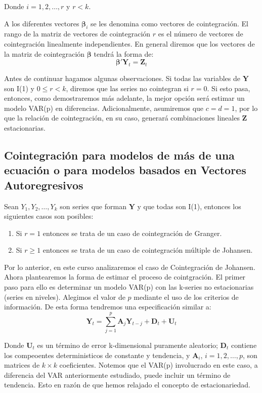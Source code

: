 \documentclass[
  a4paper,
]{article}
\begin{document}
Donde \(i = 1, 2, \ldots, r\) y \(r < k\).

A los diferentes vectores \(\boldsymbol{\beta}_i\) se les denomina como
vectores de cointegración. El rango de la matriz de vectores de
cointegración \(r\) es el número de vectores de cointegración
linealmente independientes. En general diremos que los vectores de la
matriz de cointegración \(\boldsymbol{\beta}\) tendrá la forma de: \[
    \boldsymbol{\beta}' \mathbf{Y}_t = \mathbf{Z}_t
\]

Antes de continuar hagamos algunas observaciones. Si todas las variables
de \(\mathbf{Y}\) son I(1) y \(0 \leq r < k\), diremos que las series no
cointegran si \(r = 0\). Si esto pasa, entonces, como demostraremos más
adelante, la mejor opción será estimar un modelo VAR(p) en diferencias.
Adicionalmente, asumiremos que \(c = d = 1\), por lo que la relación de
cointegración, en su caso, generará combinaciones lineales
\(\mathbf{Z}\) estacionarias.

\subsection{Cointegración para modelos de más de una ecuación o para
modelos basados en Vectores
Autoregresivos}\label{cointegraciuxf3n-para-modelos-de-muxe1s-de-una-ecuaciuxf3n-o-para-modelos-basados-en-vectores-autoregresivos}

Sean \(Y_1, Y_2, \ldots, Y_k\) son series que forman \(\mathbf{Y}\) y
que todas son I(1), entonces los siguientes casos son posibles:

\begin{enumerate}
    \item Si $r = 1$ entonces se trata de un caso de cointegración de Granger.
    \item Si $r \geq 1$ entonces se trata de un caso de cointegración múltiple de Johansen.
\end{enumerate}

Por lo anterior, en este curso analizaremos el caso de Cointegración de
Johansen. Ahora plantearemos la forma de estimar el proceso de
cointgración. El primer paso para ello es determinar un modelo VAR(p)
con las k-series no estacionarias (series en niveles). Alegimos el valor
de \(p\) mediante el uso de los criterios de información. De esta forma
tendremos una especificación similar a: \[
    \mathbf{Y}_t = \sum_{j=1}^p \mathbf{A}_j \mathbf{Y}_{t-j} + \mathbf{D}_t + \mathbf{U}_t
    \label{VAR_CI}
\]

Donde \(\mathbf{U}_t\) es un término de error k-dimensional puramente
aleatorio; \(\mathbf{D}_t\) contiene los compeoentes deterministicos de
constante y tendencia, y \(\mathbf{A}_i\), \(i = 1, 2, \ldots, p\), son
matrices de \(k \times k\) coeficientes. Notemos que el VAR(p)
involucrado en este caso, a diferencia del VAR anteriormente estudiado,
puede incluir un término de tendencia. Esto en razón de que hemos
relajado el concepto de estacionariedad.
\end{document}
